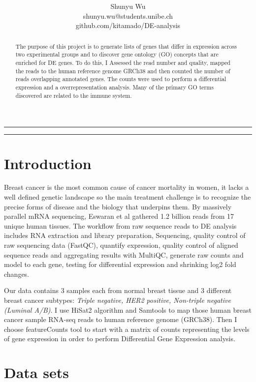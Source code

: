 \documentclass[onecolumn]{article}
\title{\spacecaps{Characterise gene expression differences
between human breast cancer subtypes }\\ \normalsize \spacesc{467713-HS2021, RNA-sequencing} }
\author{Shunyu Wu\\shunyu.wu@students.unibe.ch \\  github.com/kitamado/DE-analysis  \\}
\date{\mydate}
\begin{document}
\maketitle

\rule{\textwidth}{0.1pt}
\begin{abstract}
The purpose of this project is to generate lists of genes that differ in expression across two experimental groups and to discover gene ontology (GO) concepts that are enriched for DE genes. To do this, I Assessed the read number and quality, mapped the reads to the human reference genome GRCh38 and then counted the number of reads overlapping annotated genes. The counts were used to perform a differential expression and a overrepresentation analysis. Many of the primary GO terms discovered are related to the immune system.
\end{abstract}
\rule{\textwidth}{0.1pt}

\section{Introduction}
Breast cancer is the most common cause of cancer mortality in women, it lacks a well defined genetic landscape so the main treatment challenge is to recognize the precise forms of disease and the biology that underpins them. By massively parallel mRNA sequencing, Eswaran et al\cite{Eswaran2012} gathered 1.2 billion reads from 17 unique human tissues. The workflow from raw sequence reads to DE analysis includes RNA extraction and library preparation, Sequencing, quality control of raw sequencing data (FastQC), quantify expression, quality control of aligned sequence reads and aggregating results with MultiQC, generate raw counts and model to each gene, testing for differential expression and shrinking log2 fold changes.

Our data contains 3 samples each from normal breast tissue and 3 different breast cancer subtypes: \emph{Triple negative, HER2 positive, Non-triple negative (Luminal A/B)}.
 I use HiSat2 algorithm and Samtools to map those human breast cancer sample RNA-seq reads to human reference genome (GRCh38). Then I choose featureCounts tool to start with a matrix of counts representing the levels of gene expression in order to perform Differential Gene Expression analysis.


\section{Data sets}
\end{document}
